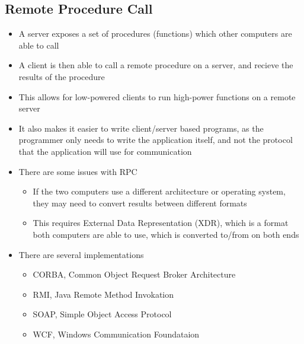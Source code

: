 \subsection*{Remote Procedure Call}

\begin{itemize}
  \item A server exposes a set of procedures (functions) which other computers are able to call
  \item A client is then able to call a remote procedure on a server, and recieve the results of the procedure
  \item This allows for low-powered clients to run high-power functions on a remote server
  \item It also makes it easier to write client/server based programs, as the programmer only needs to write the application itself, and not the protocol that the application will use for communication
  \item There are some issues with RPC
  \begin{itemize}
    \item If the two computers use a different architecture or operating system, they may need to convert results between different formats
    \item This requires External Data Representation (XDR), which is a format both computers are able to use, which is converted to/from on both ends
  \end{itemize}
  \item There are several implementations
  \begin{itemize}
    \item CORBA, Common Object Request Broker Architecture
    \item RMI, Java Remote Method Invokation
    \item SOAP, Simple Object Access Protocol
    \item WCF, Windows Communication Foundataion
  \end{itemize}
\end{itemize}